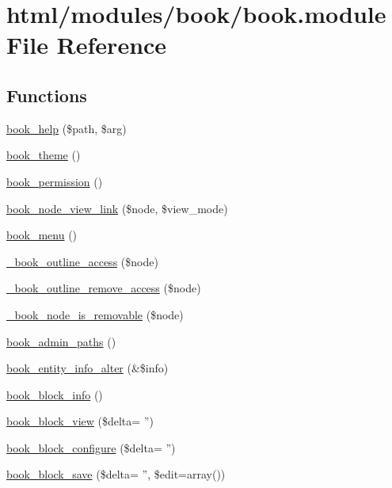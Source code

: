 \hypertarget{book_8module}{
\section{html/modules/book/book.module File Reference}
\label{book_8module}
}
\subsection*{Functions}
\begin{DoxyCompactItemize}
\item 
\hyperlink{book_8module_a48d0c1249b50c523908ea933d0953bca}{book\_\-help} (\$path, \$arg)
\item 
\hyperlink{book_8module_a4fe037bcee04d09c34a92b0be7bd945a}{book\_\-theme} ()
\item 
\hyperlink{book_8module_ac6438df768a5d96010eef0f86950d41e}{book\_\-permission} ()
\item 
\hyperlink{book_8module_ae26105281c84829027a9e23ac5b501f5}{book\_\-node\_\-view\_\-link} (\$node, \$view\_\-mode)
\item 
\hyperlink{book_8module_adc2bbd5235a769fa1ae9b02e8effc15e}{book\_\-menu} ()
\item 
\hyperlink{book_8module_a58f4f20ccdccc01d00a743f3f460f50b}{\_\-book\_\-outline\_\-access} (\$node)
\item 
\hyperlink{book_8module_a9dc2dc631b3b6fb63f5eca58c8951cfb}{\_\-book\_\-outline\_\-remove\_\-access} (\$node)
\item 
\hyperlink{book_8module_ad1358d4e9c13cd0a43dd941728b47892}{\_\-book\_\-node\_\-is\_\-removable} (\$node)
\item 
\hyperlink{book_8module_ac366ddcef153a3d0ecf21423dbb3f0e7}{book\_\-admin\_\-paths} ()
\item 
\hyperlink{book_8module_ad10ea5d5bdad3a6bb77b63a6f1167c4a}{book\_\-entity\_\-info\_\-alter} (\&\$info)
\item 
\hyperlink{book_8module_a6fea491d1d87d4c6f8d6adfac7f64abd}{book\_\-block\_\-info} ()
\item 
\hyperlink{book_8module_af0525aa2c7363bb58f08c2714da5d82f}{book\_\-block\_\-view} (\$delta= '')
\item 
\hyperlink{book_8module_a9a8e669743f131604cd0a606117b3e67}{book\_\-block\_\-configure} (\$delta= '')
\item 
\hyperlink{book_8module_a48769a6302a3aaa7d838c1c556827bf9}{book\_\-block\_\-save} (\$delta= '', \$edit=array())
\item 

\end{DoxyCompactItemize}
